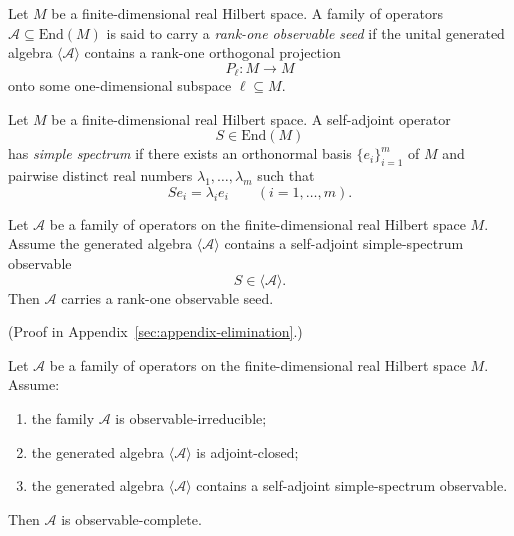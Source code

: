 \begin{definition}
\label{def:rank-one-observable-seed}
Let $M$ be a finite-dimensional real Hilbert space. A family of operators
$\mathcal A\subseteq \mathrm{End}(M)$ is said to carry a
\emph{rank-one observable seed} if the unital generated algebra
$\langle\mathcal A\rangle$ contains a rank-one orthogonal projection
\[
P_{\ell}:M\to M
\]
onto some one-dimensional subspace $\ell\subseteq M$.
\end{definition}

\begin{definition}
\label{def:simple-spectrum-observable}
Let $M$ be a finite-dimensional real Hilbert space. A self-adjoint operator
\[
S\in \mathrm{End}(M)
\]
has \emph{simple spectrum} if there exists an orthonormal basis
$\{e_i\}_{i=1}^m$ of $M$ and pairwise distinct real numbers
$\lambda_1,\dots,\lambda_m$ such that
\[
Se_i=\lambda_i e_i
\qquad(i=1,\dots,m).
\]
\end{definition}

\begin{theorem}
\label{thm:simple-spectrum-gives-rank-one-seed}
Let $\mathcal A$ be a family of operators on the finite-dimensional real
Hilbert space $M$. Assume the generated algebra $\langle\mathcal A\rangle$
contains a self-adjoint simple-spectrum observable
\[
S\in\langle\mathcal A\rangle.
\]
Then $\mathcal A$ carries a rank-one observable seed.
\end{theorem}

(Proof in Appendix~\ref{sec:appendix-elimination}.)

\begin{corollary}
\label{cor:simple-spectrum-complete}
Let $\mathcal A$ be a family of operators on the finite-dimensional real
Hilbert space $M$. Assume:
\begin{enumerate}[label=(\roman*), leftmargin=2em, itemsep=0.2em]
\item the family $\mathcal A$ is observable-irreducible;
\item the generated algebra $\langle\mathcal A\rangle$ is adjoint-closed;
\item the generated algebra $\langle\mathcal A\rangle$ contains a self-adjoint
      simple-spectrum observable.
\end{enumerate}
Then $\mathcal A$ is observable-complete.
\end{corollary}

